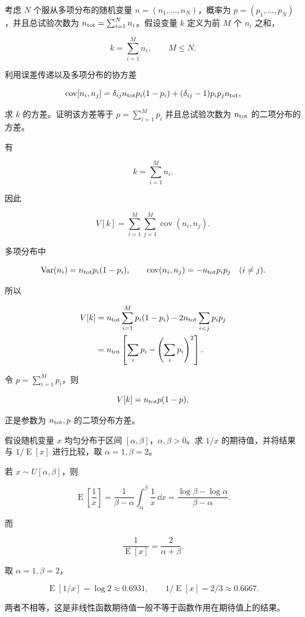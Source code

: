 ﻿


\begin{question}
考虑 \(N\) 个服从多项分布的随机变量 \(n=(n_1,\ldots,n_N)\)，概率为
\(p=(p_1,\ldots,p_N)\)，并且总试验次数为
\(n_{\rm tot}=\sum_{i=1}^{N}n_i\)。假设变量 \(k\) 定义为前 \(M\) 个
\(n_i\) 之和，

\[
k=\sum_{i=1}^{M}n_i,\qquad M\le N.
\]

利用误差传递以及多项分布的协方差

\[
\operatorname{cov}[n_i,n_j]=\delta_{ij}n_{\rm tot}p_i(1-p_i)+(\delta_{ij}-1)p_ip_jn_{\rm tot},
\]

求 \(k\) 的方差。证明该方差等于 \(p=\sum_{i=1}^{M}p_i\) 并且总试验次数为
\(n_{\rm tot}\) 的二项分布的方差。
\begin{solution}
有

\[
k=\sum_{i=1}^M n_i.
\]

因此

\[
V[k]=\sum_{i=1}^M\sum_{j=1}^M\operatorname{cov}(n_i,n_j).
\]

多项分布中

\[
\operatorname{Var}(n_i)=n_{\rm tot}p_i(1-p_i),\qquad
\operatorname{cov}(n_i,n_j)=-n_{\rm tot}p_ip_j\quad(i\ne j).
\]

所以

\[
\begin{split}
V[k]
&=n_{\rm tot}\sum_{i=1}^M p_i(1-p_i)-2n_{\rm tot}\sum_{i<j}p_ip_j\\
&=n_{\rm tot}\left[\sum_i p_i-\left(\sum_i p_i\right)^2\right].
\end{split}
\]

令 \(p=\sum_{i=1}^M p_i\)，则

\[
V[k]=n_{\rm tot}p(1-p),
\]

正是参数为 \(n_{\rm tot},p\) 的二项分布方差。
\end{solution}
\end{question}


\begin{question}
假设随机变量 \(x\) 均匀分布于区间
\([\alpha,\beta]\)，\(\alpha,\beta>0\)。求 \(1/x\) 的期待值，并将结果与
\(1/\operatorname{E}[x]\) 进行比较，取 \(\alpha=1,\beta=2\)。
\begin{solution}
若 \(x\sim U[\alpha,\beta]\)，则

\[
\operatorname{E}\left[\frac1x\right]=\frac{1}{\beta-\alpha}\int_\alpha^\beta\frac1x\,\dd{x}
=\frac{\log\beta-\log\alpha}{\beta-\alpha}.
\]

而

\[
\frac1{\operatorname{E}[x]}=\frac{2}{\alpha+\beta}.
\]

取 \(\alpha=1,\beta=2\)，

\[
\operatorname{E}[1/x]=\log2\approx0.6931,
\qquad
1/\operatorname{E}[x]=2/3\approx0.6667.
\]

两者不相等，这是非线性函数期待值一般不等于函数作用在期待值上的结果。
\end{solution}
\end{question}


